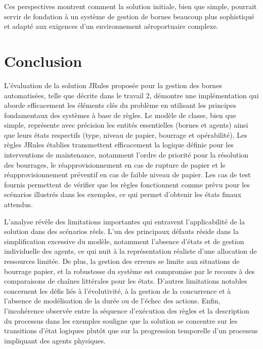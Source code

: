 \documentclass[11pt,a4paper]{article}
\begin{document}
Ces perspectives montrent comment la solution initiale, bien que simple, pourrait servir de fondation à un système de gestion de bornes beaucoup plus sophistiqué et adapté aux exigences d'un environnement aéroportuaire complexe.

\section{Conclusion}
\label{sec:conclusion}

L'évaluation de la solution JRules proposée pour la gestion des bornes automatisées, telle que décrite dans le travail 2, démontre une implémentation qui aborde efficacement les éléments clés du problème en utilisant les principes fondamentaux des systèmes à base de règles. Le modèle de classe, bien que simple, représente avec précision les entités essentielles (bornes et agents) ainsi que leurs états respectifs (type, niveau de papier, bourrage et opérabilité). Les règles JRules établies transmettent efficacement la logique définie pour les interventions de maintenance, notamment l'ordre de priorité pour la résolution des bourrages, le réapprovisionnement en cas de rupture de papier et le réapprovisionnement préventif en cas de faible niveau de papier. Les cas de test fournis permettent de vérifier que les règles fonctionnent comme prévu pour les scénarios illustrés dans les exemples, ce qui permet d'obtenir les états finaux attendus.

L'analyse révèle des limitations importantes qui entravent l'applicabilité de la solution dans des scénarios réels. L'un des principaux défauts réside dans la simplification excessive du modèle, notamment l'absence d'états et de gestion individuelle des agents, ce qui nuit à la représentation réaliste d'une allocation de ressources limitée. De plus, la gestion des erreurs se limite aux situations de bourrage papier, et la robustesse du système est compromise par le recours à des comparaisons de chaînes littérales pour les états. D'autres limitations notables concernent les défis liés à l'évolutivité, à la gestion de la concurrence et à l'absence de modélisation de la durée ou de l'échec des actions. Enfin, l'incohérence observée entre la séquence d'exécution des règles et la description du processus dans les exemples souligne que la solution se concentre sur les transitions d'état logiques plutôt que sur la progression temporelle d'un processus impliquant des agents physiques.
\end{document}
